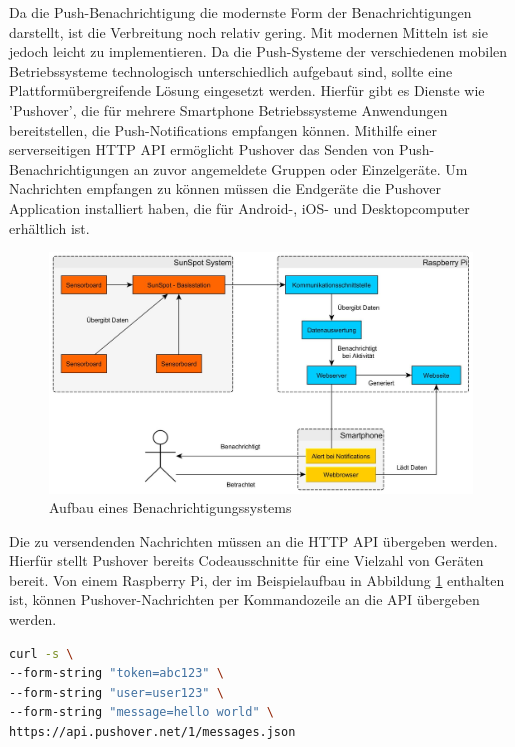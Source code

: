 Da die Push-Benachrichtigung die modernste Form der Benachrichtigungen darstellt, ist die Verbreitung noch relativ gering. Mit modernen Mitteln ist sie jedoch leicht zu implementieren.
Da die Push-Systeme der verschiedenen mobilen Betriebssysteme technologisch unterschiedlich aufgebaut sind, sollte eine Plattformübergreifende Lösung eingesetzt werden.
Hierfür gibt es Dienste wie 'Pushover', die für mehrere Smartphone Betriebssysteme Anwendungen bereitstellen, die Push-Notifications empfangen können.
Mithilfe einer serverseitigen HTTP API ermöglicht Pushover das Senden von Push-Benachrichtigungen an zuvor angemeldete Gruppen oder Einzelgeräte. Um Nachrichten empfangen zu können müssen die Endgeräte die Pushover Application installiert haben, die für Android-, iOS- und Desktopcomputer erhältlich ist.

\vspace{5 mm}
\begin{figure}[H] 
	\centering
	\includegraphics[scale=0.25]{Bilder/benachrichtigung}
	\caption{Aufbau eines Benachrichtigungssystems}
	\label{f:benachrichtigung}
\end{figure}

Die zu versendenden Nachrichten müssen an die HTTP API übergeben werden. Hierfür stellt Pushover bereits Codeausschnitte für eine Vielzahl von Geräten bereit.
Von einem Raspberry Pi, der im Beispielaufbau in Abbildung \ref{f:benachrichtigung} enthalten ist, können Pushover-Nachrichten per Kommandozeile an die API übergeben werden. 

\begin{lstlisting}[language=sh,caption={Beispielcode zum Senden einer Pushover-Nachricht},label=lst:pushovermsg,frame=single] 
curl -s \
--form-string "token=abc123" \
--form-string "user=user123" \
--form-string "message=hello world" \
https://api.pushover.net/1/messages.json
\end{lstlisting}


